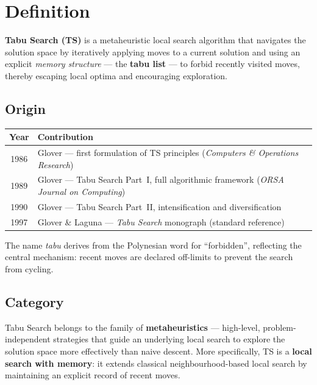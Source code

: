\documentclass[12pt,a4paper]{article}
\begin{document}
\newpage

\section{Definition}

\textbf{Tabu Search (TS)} is a metaheuristic local search algorithm that
navigates the solution space by iteratively applying moves to a current
solution and using an explicit \emph{memory structure} --- the \textbf{tabu
list} --- to forbid recently visited moves, thereby escaping local optima and
encouraging exploration.

\subsection*{Origin}

\begin{center}
\begin{tabularx}{\linewidth}{cX}
\toprule
\textbf{Year} & \textbf{Contribution} \\
\midrule
1986 & Glover --- first formulation of TS principles
       (\textit{Computers \& Operations Research}) \\
1989 & Glover --- Tabu Search Part~I, full algorithmic framework
       (\textit{ORSA Journal on Computing}) \\
1990 & Glover --- Tabu Search Part~II, intensification and diversification \\
1997 & Glover \& Laguna --- \textit{Tabu Search} monograph (standard reference) \\
\bottomrule
\end{tabularx}
\end{center}

The name \textit{tabu} derives from the Polynesian word for ``forbidden'',
reflecting the central mechanism: recent moves are declared off-limits to
prevent the search from cycling.

\subsection*{Category}

Tabu Search belongs to the family of \textbf{metaheuristics} --- high-level,
problem-independent strategies that guide an underlying local search to explore
the solution space more effectively than naive descent.
More specifically, TS is a \textbf{local search with memory}: it extends
classical neighbourhood-based local search by maintaining an explicit record
of recent moves.
\end{document}
